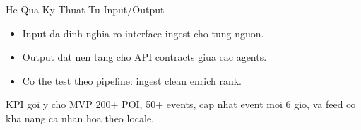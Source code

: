 \begin{frame}[t]{He Qua Ky Thuat Tu Input/Output}
\begin{itemize}
    \item Input da dinh nghia ro interface ingest cho tung nguon.
    \item Output dat nen tang cho API contracts giua cac agents.
    \item Co the test theo pipeline: ingest \textrightarrow clean \textrightarrow enrich \textrightarrow rank.
\end{itemize}

\vspace{0.35cm}
\begin{block}{KPI goi y cho MVP}
200+ POI, 50+ events, cap nhat event moi 6 gio, va feed co kha nang ca nhan hoa theo locale.
\end{block}
\end{frame}

